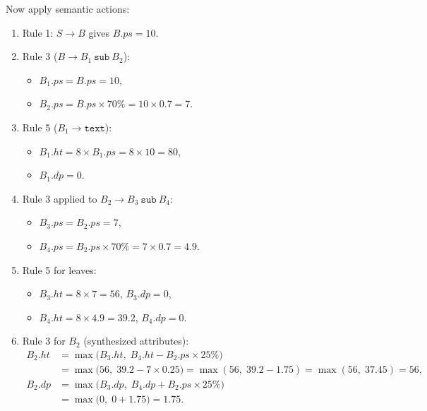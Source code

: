 Now apply semantic actions:

\begin{enumerate}
    \item Rule 1: $S \to B$ gives $B.\mathit{ps} = 10$.

    \item Rule 3 ($B \to B_1\ \texttt{sub}\ B_2$):
    \begin{itemize}
        \item $B_1.\mathit{ps} = B.\mathit{ps} = 10$,
        \item $B_2.\mathit{ps} = B.\mathit{ps} \times 70\% = 10 \times 0.7 = 7$.
    \end{itemize}

    \item Rule 5 ($B_1 \to \texttt{text}$):
    \begin{itemize}
        \item $B_1.\mathit{ht} = 8 \times B_1.\mathit{ps} = 8 \times 10 = 80$,
        \item $B_1.\mathit{dp} = 0$.
    \end{itemize}

    \item Rule 3 applied to $B_2 \to B_3\ \texttt{sub}\ B_4$:
    \begin{itemize}
        \item $B_3.\mathit{ps} = B_2.\mathit{ps} = 7$,
        \item $B_4.\mathit{ps} = B_2.\mathit{ps} \times 70\% = 7 \times 0.7 = 4.9$.
    \end{itemize}

    \item Rule 5 for leaves:
    \begin{itemize}
        \item $B_3.\mathit{ht} = 8 \times 7 = 56$, \quad $B_3.\mathit{dp} = 0$,
        \item $B_4.\mathit{ht} = 8 \times 4.9 = 39.2$, \quad $B_4.\mathit{dp} = 0$.
    \end{itemize}

    \item Rule 3 for $B_2$ (synthesized attributes):
    \begin{align*}
        B_2.\mathit{ht} &= \max\bigl(B_3.\mathit{ht},\; B_4.\mathit{ht} - B_2.\mathit{ps} \times 25\%\bigr) \\
                        &= \max\bigl(56,\; 39.2 - 7 \times 0.25\bigr) = \max(56,\; 39.2 - 1.75) = \max(56,\; 37.45) = 56, \\
        B_2.\mathit{dp} &= \max\bigl(B_3.\mathit{dp},\; B_4.\mathit{dp} + B_2.\mathit{ps} \times 25\%\bigr) \\
                        &= \max\bigl(0,\; 0 + 1.75\bigr) = 1.75.
    \end{align*}


\end{enumerate}

